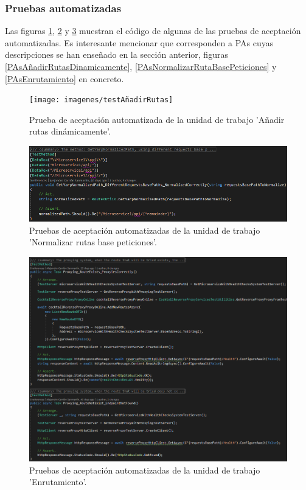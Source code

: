\documentclass[11pt,spanish,listoffigures]{tfgetsinf}
\begin{document}

			\subsubsection{Pruebas automatizadas}

Las figuras \ref{testAñadirRutas}, \ref{testGetYarpNormalizedRequestsBasePath} y \ref{testsEnrutamiento} muestran el código de algunas de las pruebas de aceptación automatizadas. Es interesante mencionar que corresponden a PAs cuyas descripciones se han enseñado en la sección anterior, figuras \ref{PAsAñadirRutasDinamicamente}, \ref{PAsNormalizarRutaBasePeticiones} y \ref{PAsEnrutamiento} en concreto.

\begin{figure}[ht]
\centering
\texttt{[image: imagenes/testAñadirRutas]}
\caption{Prueba de aceptación automatizada de la unidad de trabajo 'Añadir rutas dinámicamente'.}
	\label{testAñadirRutas}
\end{figure}

\begin{figure}[ht]
\centering
\includegraphics[width=1\textwidth]{imagenes/testGetYarpNormalizedRequestsBasePath}
\caption{Pruebas de aceptación automatizadas de la unidad de trabajo 'Normalizar rutas base peticiones'.}
	\label{testGetYarpNormalizedRequestsBasePath}
\end{figure}

\begin{figure}[ht]
\centering
\includegraphics[width=1\textwidth]{imagenes/testsEnrutamiento}
\caption{Pruebas de aceptación automatizadas de la unidad de trabajo 'Enrutamiento'.}
	\label{testsEnrutamiento}
\end{figure}
\end{document}
